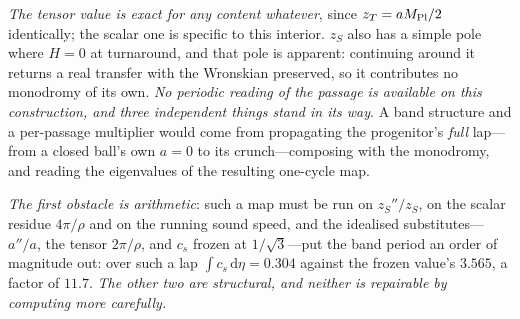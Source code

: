 \documentclass[11pt,a4paper]{article}
\theoremstyle{plain}
\theoremstyle{definition}
\theoremstyle{remark}
\begin{document}
\emph{The tensor value is exact for any content whatever}, since $z_T=aM_{\rm Pl}/2$ identically; the scalar one is specific to this interior. $z_S$ also has a simple pole where $H=0$ at turnaround, and that pole is apparent: continuing around it returns a real transfer with the Wronskian preserved, so it contributes no monodromy of its own. \emph{No periodic reading of the passage is available on this construction, and three independent things stand in its way}. A band structure and a per-passage multiplier would come from propagating the progenitor's \emph{full} lap---from a closed ball's own $a=0$ to its crunch---composing with the monodromy, and reading the eigenvalues of the resulting one-cycle map. 

\emph{The first obstacle is arithmetic}: such a map must be run on $z_S''/z_S$, on the scalar residue $4\pi/\rho$ and on the running sound speed, and the idealised substitutes---$a''/a$, the tensor $2\pi/\rho$, and $c_s$ frozen at $1/\sqrt3$---put the band period an order of magnitude out: over such a lap $\int c_s\,\mathrm{d}\eta=0.304$ against the frozen value's $3.565$, a factor of $11.7$. \emph{The other two are structural, and neither is repairable by computing more carefully.} 
\end{document}
